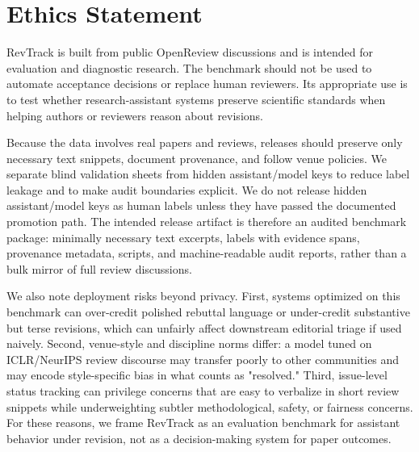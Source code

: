 \section{Ethics Statement}

RevTrack is built from public OpenReview discussions and is intended for evaluation and diagnostic research.
The benchmark should not be used to automate acceptance decisions or replace human reviewers.
Its appropriate use is to test whether research-assistant systems preserve scientific standards when helping authors or reviewers reason about revisions.

Because the data involves real papers and reviews, releases should preserve only necessary text snippets, document provenance, and follow venue policies.
We separate blind validation sheets from hidden assistant/model keys to reduce label leakage and to make audit boundaries explicit.
We do not release hidden assistant/model keys as human labels unless they have passed the documented promotion path.
The intended release artifact is therefore an audited benchmark package: minimally necessary text excerpts, labels with evidence spans, provenance metadata, scripts, and machine-readable audit reports, rather than a bulk mirror of full review discussions.

We also note deployment risks beyond privacy.
First, systems optimized on this benchmark can over-credit polished rebuttal language or under-credit substantive but terse revisions, which can unfairly affect downstream editorial triage if used naively.
Second, venue-style and discipline norms differ: a model tuned on ICLR/NeurIPS review discourse may transfer poorly to other communities and may encode style-specific bias in what counts as "resolved."
Third, issue-level status tracking can privilege concerns that are easy to verbalize in short review snippets while underweighting subtler methodological, safety, or fairness concerns.
For these reasons, we frame RevTrack as an evaluation benchmark for assistant behavior under revision, not as a decision-making system for paper outcomes.
